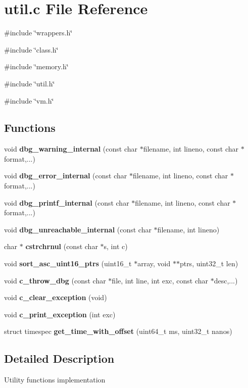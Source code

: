 \section{util.c File Reference}
\label{util_8c}
{\ttfamily \#include \char`\"{}wrappers.h\char`\"{}}\par
{\ttfamily \#include \char`\"{}class.h\char`\"{}}\par
{\ttfamily \#include \char`\"{}memory.h\char`\"{}}\par
{\ttfamily \#include \char`\"{}util.h\char`\"{}}\par
{\ttfamily \#include \char`\"{}vm.h\char`\"{}}\par
\subsection*{Functions}
\begin{DoxyCompactItemize}
\item 
void {\bf dbg\_\-warning\_\-internal} (const char $\ast$filename, int lineno, const char $\ast$format,...)
\item 
void {\bf dbg\_\-error\_\-internal} (const char $\ast$filename, int lineno, const char $\ast$format,...)
\item 
void {\bf dbg\_\-printf\_\-internal} (const char $\ast$filename, int lineno, const char $\ast$format,...)
\item 
void {\bf dbg\_\-unreachable\_\-internal} (const char $\ast$filename, int lineno)
\item 
char $\ast$ {\bf cstrchrnul} (const char $\ast$s, int c)
\item 
void {\bf sort\_\-asc\_\-uint16\_\-ptrs} (uint16\_\-t $\ast$array, void $\ast$$\ast$ptrs, uint32\_\-t len)
\item 
void {\bf c\_\-throw\_\-dbg} (const char $\ast$file, int line, int exc, const char $\ast$desc,...)
\item 
void {\bf c\_\-clear\_\-exception} (void)
\item 
void {\bf c\_\-print\_\-exception} (int exc)
\item 
struct timespec {\bf get\_\-time\_\-with\_\-offset} (uint64\_\-t ms, uint32\_\-t nanos)
\end{DoxyCompactItemize}


\subsection{Detailed Description}
Utility functions implementation 

